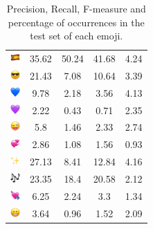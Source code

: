 \documentclass{article}
\begin{document}
\begin{table}
\begin{tabular}{|c|ccc|c|}
\includegraphics[height=0.37cm,width=0.37cm]{img/Spain.png} & 35.62 & 50.24 & 41.68 & 4.24\\ 
\includegraphics[height=0.37cm,width=0.37cm]{img/smiling_face_with_sunglasses.png} & 21.43 & 7.08 & 10.64 & 3.39\\ 
\includegraphics[height=0.37cm,width=0.37cm]{img/blue_heart.png} & 9.78 & 2.18 & 3.56 & 4.13\\ 
\includegraphics[height=0.37cm,width=0.37cm]{img/purple_heart.png} & 2.22 & 0.43 & 0.71 & 2.35\\ 
\includegraphics[height=0.37cm,width=0.37cm]{img/winking_face_with_tongue.png} & 5.8 & 1.46 & 2.33 & 2.74\\ 
\includegraphics[height=0.37cm,width=0.37cm]{img/revolving_hearts.png} & 2.86 & 1.08 & 1.56 & 0.93\\ 
\includegraphics[height=0.37cm,width=0.37cm]{img/sparkles.png} & 27.13 & 8.41 & 12.84 & 4.16\\ 
\includegraphics[height=0.37cm,width=0.37cm]{img/musical_notes.png} & 23.35 & 18.4 & 20.58 & 2.12\\ 
\includegraphics[height=0.37cm,width=0.37cm]{img/heart_with_arrow.png} & 6.25 & 2.24 & 3.3 & 1.34\\ 
\includegraphics[height=0.37cm,width=0.37cm]{img/beaming_face_with_smiling_eyes.png} & 3.64 & 0.96 & 1.52 & 2.09\\ 

\hline
\end{tabular}
\caption{\label{table:emoji_detailed} Precision, Recall, F-measure and percentage of occurrences in the test set of each emoji.}
\end{table}
\end{document}
